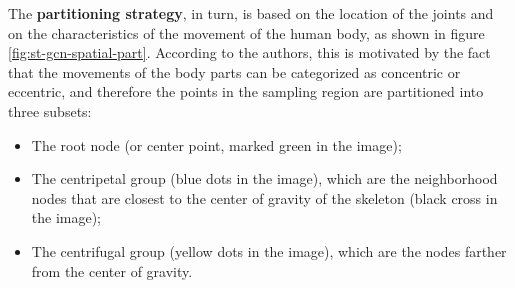 

The \textbf{partitioning strategy}, in turn, is based on the location of the joints and on the characteristics of the movement of the human body, as shown in figure \ref{fig:st-gcn-spatial-part}. According to the authors, this is motivated by the fact that the movements of the body parts can be categorized as concentric or eccentric, and therefore the points in the sampling region are partitioned into three subsets:
    

\begin{itemize}
    \item The root node (or center point, marked green in the image);
    \item The centripetal group (blue dots in the image), which are the neighborhood nodes that are closest to the center of gravity of the skeleton (black cross in the image);
    \item The centrifugal group (yellow dots in the image), which are the nodes farther from the center of gravity.
\end{itemize}



